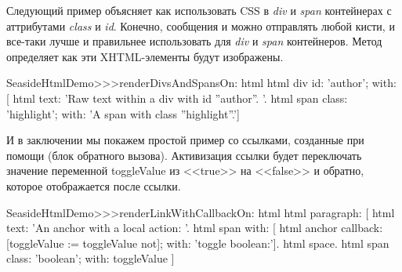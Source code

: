 \documentclass[a4paper,10pt,twoside]{book}
\begin{document}

Следующий пример объясняет как использовать CSS в \emph{div} и
\emph{span} контейнерах с аттрибутами \emph{class} и \emph{id}.
Конечно, сообщения  и  можно отправлять любой кисти,
и все-таки лучше и правильнее использовать
для \emph{div} и \emph{span} контейнеров.
Метод  определяет как эти XHTML-элементы
будут изображены.

\begin{code}{}
SeasideHtmlDemo>>>renderDivsAndSpansOn: html 
	html div
		id: 'author';
		with: [
			html text: 'Raw text within a div with id ''author''. '.
			html span
				class: 'highlight';
				with: 'A span with class ''highlight''.']
\end{code}


И в заключении мы покажем простой пример со ссылками,
созданные при помощи  (блок обратного вызова).
Активизация ссылки будет переключать значение переменной toggleValue
из <<true>> на <<false>> и обратно, которое отображается после ссылки.

\begin{code}{}
SeasideHtmlDemo>>>renderLinkWithCallbackOn: html 
	html paragraph: [
		html text: 'An anchor with a local action: '.
		html span with: [
			html anchor
				callback: [toggleValue := toggleValue not];
				with: 'toggle boolean:'].
		html space.
		html span
			class: 'boolean';
			with: toggleValue ]
\end{code}


\end{document}
